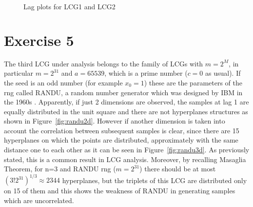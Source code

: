 \documentclass[10pt]{article}
\begin{document}
\begin{figure}[h]
  \centering
  \caption{Lag plots for LCG1 and LCG2}
  \label{fig:lcg}
\end{figure}

\FloatBarrier

\section{Exercise 5}
The third LCG under analysis belongs to the family of LCGs with $m = 2^M$, in particular $m = 2^{31}$ and $a = 65539$, which is a prime number ($c = 0$ as usual). If the seed is an odd number (for example $x_0 = 1$) these are the parameters of the rng called RANDU, a random number generator which was designed by IBM in the 1960s \cite{kn}. Apparently, if just 2 dimensions are observed, the samples at lag 1 are equally distributed in the unit square and there are not hyperplanes structures as shown in Figure~\ref{fig:randu2d}. However if another dimension is taken into account the correlation between subsequent samples is clear, since there are 15 hyperplanes on which the points are distributed, approximately with the same distance one to each other as it can be seen in Figure~\ref{fig:randu3d}. As previously stated, this is a common result in LCG analysis. Moreover, by recalling Masaglia Theorem, for n=3 and RANDU rng ($m = 2^{31}$) there should be at most $(3! 2^{31})^{1/3} \approx 2344$ hyperplanes, but the triplets of this LCG are distributed only on 15 of them and this shows the weakness of RANDU in generating samples which are uncorrelated.
\end{document}
